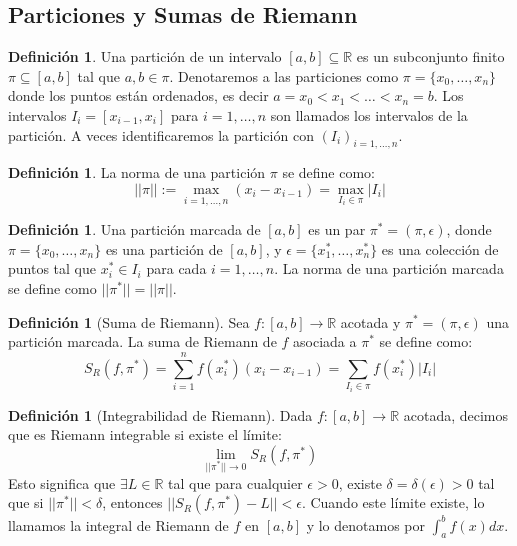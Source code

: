 \documentclass[11pt]{article}
\theoremstyle{definition} %
\newtheorem{definition}[theorem]{Definición}
\begin{document}
\subsection{Particiones y Sumas de Riemann}

\begin{definition}
Una partición de un intervalo $[a,b] \subseteq \mathbb{R}$ es un subconjunto finito $\pi \subseteq [a,b]$ tal que $a,b \in \pi$. Denotaremos a las particiones como $\pi = \{x_0, \dots, x_n\}$ donde los puntos están ordenados, es decir $a=x_0 < x_1 < \dots < x_n = b$. Los intervalos $I_i = [x_{i-1}, x_i]$ para $i=1,\dots,n$ son llamados los intervalos de la partición. A veces identificaremos la partición con $(I_i)_{i=1,\dots,n}.$
\end{definition}

\begin{definition}
La norma de una partición $\pi$ se define como:
$$ ||\pi|| := \max_{i=1,\dots,n}(x_i - x_{i-1}) = \max_{I_i \in \pi} |I_i| $$
\end{definition}

\begin{definition}
Una partición marcada de $[a,b]$ es un par $\pi^* = (\pi, \epsilon)$, donde $\pi = \{x_0, \dots, x_n\}$ es una partición de $[a,b]$, y $\epsilon = \{x_1^*, \dots, x_n^*\}$ es una colección de puntos tal que $x_i^* \in I_i$ para cada $i=1,\dots,n$. La norma de una partición marcada se define como $||\pi^*|| = ||\pi||$.
\end{definition}

\begin{definition}[Suma de Riemann]
Sea $f:[a,b] \rightarrow \mathbb{R}$ acotada y $\pi^* = (\pi, \epsilon)$ una partición marcada. La suma de Riemann de $f$ asociada a $\pi^*$ se define como:
$$ S_R(f, \pi^*) = \sum_{i=1}^{n} f(x_i^*)(x_i - x_{i-1}) = \sum_{I_i \in \pi} f(x_i^*) |I_i| $$
\end{definition}

\begin{definition}[Integrabilidad de Riemann]
Dada $f:[a,b] \rightarrow \mathbb{R}$ acotada, decimos que es Riemann integrable si existe el límite:
$$ \lim_{||\pi^*|| \rightarrow 0} S_R(f, \pi^*) $$
Esto significa que $\exists L \in \mathbb{R}$ tal que para cualquier $\epsilon > 0$, existe $\delta = \delta(\epsilon) > 0$ tal que si $||\pi^*|| < \delta$, entonces $||S_R(f, \pi^*) - L|| < \epsilon$. Cuando este límite existe, lo llamamos la integral de Riemann de $f$ en $[a,b]$ y lo denotamos por $\int_{a}^{b} f(x)dx$.
\end{definition}
\end{document}
